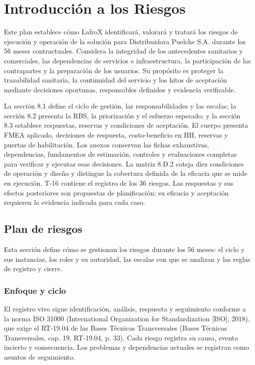 \setcounter{chapter}{7}
\chapter{Introducción a los Riesgos}

Este plan establece cómo LafroX identificará, valorará y tratará los riesgos de ejecución y operación de la solución para Distribuidora Puelche S.A. durante los 56 meses contractuales. Considera la integridad de los antecedentes sanitarios y comerciales, las dependencias de servicios e infraestructura, la participación de las contrapartes y la preparación de los usuarios. Su propósito es proteger la trazabilidad sanitaria, la continuidad del servicio y los hitos de aceptación mediante decisiones oportunas, responsables definidos y evidencia verificable.

La sección 8.1 define el ciclo de gestión, las responsabilidades y las escalas; la sección 8.2 presenta la RBS, la priorización y el esfuerzo esperado; y la sección 8.3 establece respuestas, reservas y condiciones de aceptación. El cuerpo presenta FMEA aplicado, decisiones de respuesta, costo-beneficio en HH, reservas y puertas de habilitación. Los anexos conservan las fichas exhaustivas, dependencias, fundamentos de estimación, controles y evaluaciones completas para verificar y ejecutar esas decisiones. La matriz 8.D.2 coteja diez condiciones de operación y diseño y distingue la cobertura definida de la eficacia que se mide en ejecución. T-16 contiene el registro de los 36 riesgos. Las respuestas y sus efectos posteriores son propuestas de planificación: su eficacia y aceptación requieren la evidencia indicada para cada caso.

\section{Plan de riesgos}

Esta sección define cómo se gestionan los riesgos durante los 56 meses: el ciclo y sus instancias, los roles y su autoridad, las escalas con que se analizan y las reglas de registro y cierre.

\subsection{Enfoque y ciclo}

El registro vivo sigue identificación, análisis, respuesta y seguimiento conforme a la norma ISO 31000 (International Organization for Standardization [ISO], 2018), que exige el RT-19.04 de las Bases Técnicas Transversales (Bases Técnicas Transversales, cap. 19, RT-19.04, p. 33). Cada riesgo registra su causa, evento incierto y consecuencia. Los problemas y dependencias actuales se registran como asuntos de seguimiento.

